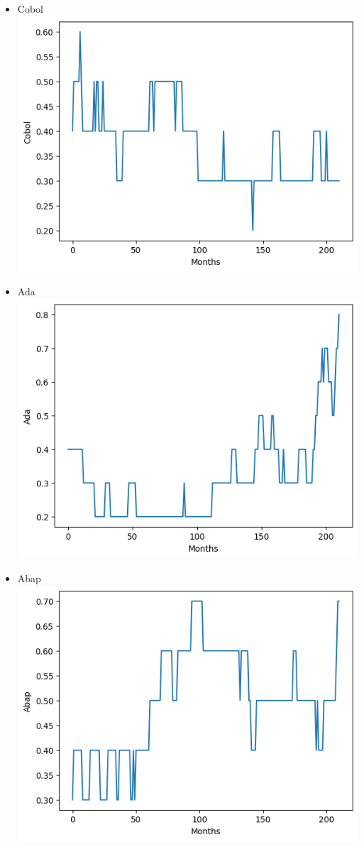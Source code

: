 \documentclass[conference]{IEEEtran}
\begin{document}
\begin{itemize}
\item{Cobol}
\includegraphics[scale=0.4]{lineplot/cobol.png}
\item{Ada}
\includegraphics[scale=0.4]{lineplot/ada.png}
\item{Abap}
\includegraphics[scale=0.4]{lineplot/abap.png}
\end{itemize}
\end{document}
